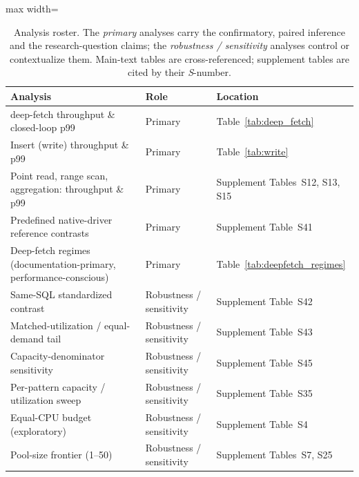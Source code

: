 \begin{table}[htbp]
  \centering
  \small
  \caption{Analysis roster. The \emph{primary} analyses carry the confirmatory,
    paired inference and the research-question claims; the \emph{robustness /
    sensitivity} analyses control or contextualize them. Main-text tables are
    cross-referenced; supplement tables are cited by their \textsl{S}-number.}
  \label{tab:analysis_roster}
  \begin{adjustbox}{max width=\textwidth}
  \begin{tabular}{@{}l l l@{}}
    \toprule
    Analysis & Role & Location \\
    \midrule
    deep-fetch throughput \& closed-loop p99      & Primary & Table~\ref{tab:deep_fetch} \\
    Insert (write) throughput \& p99                     & Primary & Table~\ref{tab:write} \\
    Point read, range scan, aggregation: throughput \& p99 & Primary & Supplement Tables~S12, S13, S15 \\
    Predefined native-driver reference contrasts         & Primary & Supplement Table~S41 \\
    Deep-fetch regimes (documentation-primary, performance-conscious) & Primary & Table~\ref{tab:deepfetch_regimes} \\
    \midrule
    Same-SQL standardized contrast                       & Robustness / sensitivity & Supplement Table~S42 \\
    Matched-utilization / equal-demand tail              & Robustness / sensitivity & Supplement Table~S43 \\
    Capacity-denominator sensitivity                     & Robustness / sensitivity & Supplement Table~S45 \\
    Per-pattern capacity / utilization sweep             & Robustness / sensitivity & Supplement Table~S35 \\
    Equal-CPU budget (exploratory)                       & Robustness / sensitivity & Supplement Table~S4 \\
    Pool-size frontier (1--50)                           & Robustness / sensitivity & Supplement Tables~S7, S25 \\

\end{tabular}
\end{adjustbox}
\end{table}
